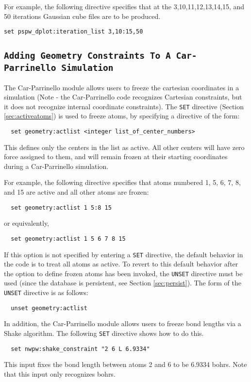 For example, the following directive specifies that at the 
3,10,11,12,13,14,15, and 50 iterations Gaussian cube files are to be produced.

\begin{verbatim}
set pspw_dplot:iteration_list 3,10:15,50
\end{verbatim}

\subsection{\tt Adding Geometry Constraints To A Car-Parrinello Simulation}
\label{sec:pspw_CP_constraint}
The Car-Parrinello module allows users to freeze the cartesian coordinates 
in a simulation (Note - the Car-Parrinello code recognizes Cartesian
constraints, but it does not recognize internal coordinate constraints).  
The \verb+SET+ directive (Section \ref{sec:activeatoms}) is used to freeze
atoms, by specifying a directive of the form:
\begin{verbatim}
  set geometry:actlist <integer list_of_center_numbers>
\end{verbatim}
This defines only the centers in the list as active.  All other
centers will have zero force assigned to them, and will remain frozen
at their starting coordinates during a Car-Parrinello simulation.

For example, the following directive specifies that atoms numbered 1,
5, 6, 7, 8, and 15 are active and all other atoms are frozen:
\begin{verbatim}
  set geometry:actlist 1 5:8 15
\end{verbatim}
or equivalently,
\begin{verbatim}
  set geometry:actlist 1 5 6 7 8 15
\end{verbatim}

If this option is not specified by entering a \verb+SET+ directive,
the default behavior in the code is to treat all atoms as active.  To
revert to this default behavior after the option to define frozen
atoms has been invoked, the \verb+UNSET+ directive must be used (since
the database is persistent, see Section \ref{sec:persist}).  The form
of the \verb+UNSET+ directive is as follows:
\begin{verbatim}
  unset geometry:actlist
\end{verbatim}


In addition, the Car-Parrinello module allows users to freeze bond
lengths via a Shake algorithm.  The following \verb+SET+ directive 
shows how to do this.
\begin{verbatim}
  set nwpw:shake_constraint "2 6 L 6.9334"
\end{verbatim}
This input fixes the bond length between atoms 2 and 6 to be
6.9334 bohrs.  Note that this input only recognizes bohrs.  


